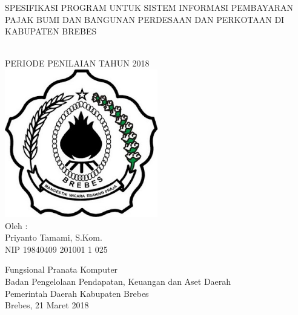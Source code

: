 \begin{titlepage}

\begin{center}
{\large SPESIFIKASI PROGRAM UNTUK SISTEM INFORMASI PEMBAYARAN PAJAK BUMI DAN BANGUNAN PERDESAAN DAN PERKOTAAN DI KABUPATEN BREBES}

\HRule\\[1cm]

PERIODE PENILAIAN TAHUN 2018\\[1cm]

\includegraphics[width=0.5\textwidth]{./resources/logo}\\[1cm]

Oleh :\\
Priyanto Tamami, S.Kom.\\
NIP 19840409 201001 1 025\\


\vfill


Fungsional Pranata Komputer\\
Badan Pengelolaan Pendapatan, Keuangan dan Aset Daerah\\
Pemerintah Daerah Kabupaten Brebes\\
Brebes, 21 Maret 2018
\end{center}

\end{titlepage}